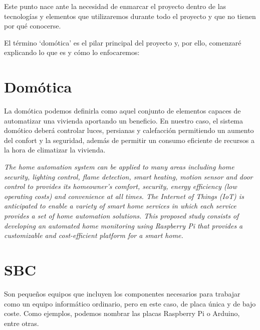 
\label{cap:Conceptos teóricos}

Este punto nace ante la necesidad de enmarcar el proyecto dentro de las tecnologías y elementos que utilizaremos durante todo el proyecto y que no tienen por qué conocerse.

El término `domótica’ es el pilar principal del proyecto y, por ello, comenzaré explicando lo que es y cómo lo enfocaremos:

\section{Domótica}\label{concepto:Domótica}
La domótica podemos definirla como aquel conjunto de elementos capaces de automatizar una vivienda aportando un beneficio.
En nuestro caso, el sistema domótico deberá controlar luces, persianas y calefacción permitiendo un aumento del confort y la seguridad, además de permitir un consumo eficiente de recursos a la hora de climatizar la vivienda.

\begin{displayquote}
\textit{The home automation system can be applied to many areas including home security, lighting control, flame detection, smart heating, motion sensor and door control to provides its homeowner's comfort, security, energy efficiency (low operating costs) and convenience at all times. The Internet of Things (IoT) is anticipated to enable a variety of smart home services in which each service provides a set of home automation solutions. This proposed study consists of developing an automated home monitoring using Raspberry Pi that provides a customizable and cost-efficient platform for a smart home.}
\cite{inproceedings:CitaDomotica}
\end{displayquote}

\section{SBC}
Son pequeños equipos  que incluyen los componentes necesarios para trabajar como un equipo informático ordinario, pero en este caso, de placa única y de bajo coste. Como ejemplos, podemos nombrar las placas Raspberry Pi o Arduino, entre otras.

